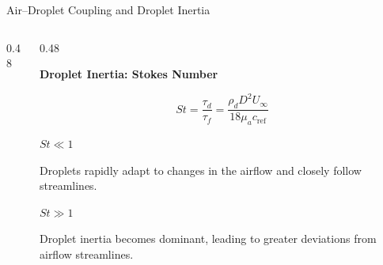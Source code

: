 \begin{frame}{Air--Droplet Coupling and Droplet Inertia}
\begin{columns}[T,onlytextwidth]
\begin{column}{0.48\textwidth}
\begin{center}
\begin{tikzpicture}[
    every node/.style={font=\small}
]
\end{tikzpicture}
\end{center}

\end{column}

\begin{column}{0.48\textwidth}

{\color{champsBlue}\bfseries
Droplet Inertia: Stokes Number}

\vspace{0.22cm}

\[
St = \frac{\tau_d}{\tau_f}
= \frac{\rho_d D^2 U_\infty}
{18\mu_a c_{\mathrm{ref}}}
\]

\vspace{0.25cm}

{\color{champsBlue}\bfseries
$St \ll 1$}

{\small
Droplets rapidly adapt to changes in
the airflow and closely follow streamlines.
}

\vspace{0.28cm}

{\color{champsBlue}\bfseries
$St \gg 1$}

{\small
Droplet inertia becomes dominant,
leading to greater deviations
from airflow streamlines.
}

\end{column}

\end{columns}

\vfill

\begin{center}
\end{center}

\end{frame}


